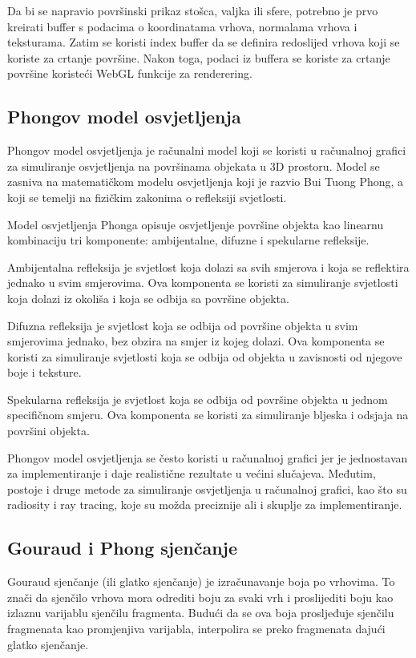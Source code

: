 \documentclass[a4paper,12pt]{article}
\begin{document}
Da bi se napravio površinski prikaz stošca, valjka ili sfere, potrebno je prvo kreirati buffer s podacima o koordinatama vrhova, normalama vrhova i teksturama. Zatim se koristi index buffer da se definira redoslijed vrhova koji se koriste za crtanje površine. Nakon toga, podaci iz buffera se koriste za crtanje površine koristeći WebGL funkcije za renderering.

\clearpage
\subsection*{Phongov model osvjetljenja}
Phongov model osvjetljenja je računalni model koji se koristi u računalnoj grafici za simuliranje osvjetljenja na površinama objekata u 3D prostoru. Model se zasniva na matematičkom modelu osvjetljenja koji je razvio Bui Tuong Phong, a koji se temelji na fizičkim zakonima o refleksiji svjetlosti.

Model osvjetljenja Phonga opisuje osvjetljenje površine objekta kao linearnu kombinaciju tri komponente: ambijentalne, difuzne i spekularne refleksije.

Ambijentalna refleksija je svjetlost koja dolazi sa svih smjerova i koja se reflektira jednako u svim smjerovima. Ova komponenta se koristi za simuliranje svjetlosti koja dolazi iz okoliša i koja se odbija sa površine objekta.

Difuzna refleksija je svjetlost koja se odbija od površine objekta u svim smjerovima jednako, bez obzira na smjer iz kojeg dolazi. Ova komponenta se koristi za simuliranje svjetlosti koja se odbija od objekta u zavisnosti od njegove boje i teksture.

Spekularna refleksija je svjetlost koja se odbija od površine objekta u jednom specifičnom smjeru. Ova komponenta se koristi za simuliranje bljeska i odsjaja na površini objekta.

Phongov model osvjetljenja se često koristi u računalnoj grafici jer je jednostavan za implementiranje i daje realistične rezultate u većini slučajeva. Međutim, postoje i druge metode za simuliranje osvjetljenja u računalnoj grafici, kao što su radiosity i ray tracing, koje su možda preciznije ali i skuplje za implementiranje.
\subsection*{Gouraud i Phong sjenčanje}

Gouraud sjenčanje (ili glatko sjenčanje) je izračunavanje boja po vrhovima. 
To znači da sjenčilo vrhova mora odrediti boju za svaki vrh i proslijediti boju kao izlaznu varijablu sjenčilu fragmenta. 
Budući da se ova boja prosljeđuje sjenčilu fragmenata kao promjenjiva varijabla, interpolira se preko fragmenata dajući glatko sjenčanje.
\end{document}
